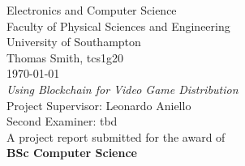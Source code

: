 
\thispagestyle{empty}
	
\begin{center}

\vspace{0.2cm}
\Large
Electronics and Computer Science\\
Faculty of Physical Sciences and Engineering\\
University of Southampton\\
\vspace{1cm}
Thomas Smith, tcs1g20\\
\today\\
\vspace{1cm}
\textit{Using Blockchain for Video Game Distribution}\\
\vspace{1cm}
Project Supervisor: Leonardo Aniello\\
Second Examiner: tbd\\
\vspace{1cm}
A project report submitted for the award of\\
\textbf{BSc Computer Science}

\end{center}

\newpage